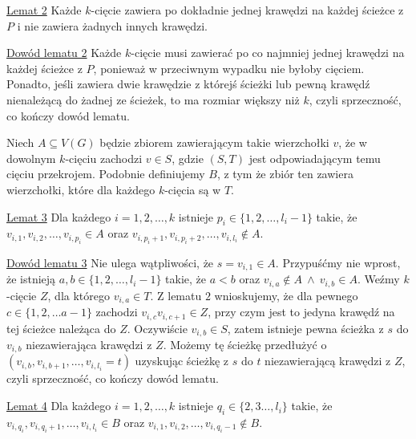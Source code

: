 \documentclass[12pt]{article}
\begin{document}
	\medskip
	
	\underline{Lemat 2} Każde \(k\)-cięcie zawiera po dokładnie jednej krawędzi
	na każdej ścieżce z \(P\) i nie zawiera żadnych innych krawędzi.
	
	\medskip
	
	\underline{Dowód lematu 2} Każde \(k\)-cięcie musi zawierać po co najmniej
	jednej krawędzi na każdej ścieżce z \(P\), ponieważ w przeciwnym wypadku nie
	byłoby cięciem. Ponadto, jeśli zawiera dwie krawędzie z którejś ścieżki lub
	pewną krawędź nienależącą do żadnej ze ścieżek, to ma rozmiar większy niż
	\(k\), czyli sprzeczność, co kończy dowód lematu.
	
	\medskip
	
	Niech \(A \subseteq V(G)\) będzie zbiorem zawierającym takie wierzchołki
	\(v\), że w dowolnym \(k\)-cięciu zachodzi \(v \in S\), gdzie \((S, T)\)
	jest odpowiadającym temu cięciu przekrojem. Podobnie definiujemy \(B\), z
	tym że zbiór ten zawiera wierzchołki, które dla każdego \(k\)-cięcia są w
	\(T\).
	
	\medskip
	
	\underline{Lemat 3} Dla każdego \(i = 1, 2, \ldots, k\) istnieje \(p_{i} \in
	\{ 1, 2, \ldots, l_{i} - 1\}\) takie, że \(v_{i, 1}, v_{i, 2}, \ldots, v_{i,
	p_{i}} \in A\) oraz \(v_{i, p_{i} + 1}, v_{i, p_{i} + 2}, \ldots, v_{i,
	l_{i}} \notin A\).
	
	\medskip
	
	\underline{Dowód lematu 3} Nie ulega wątpliwości, że \(s = v_{i, 1} \in A\).
	Przypuśćmy nie wprost, że istnieją \(a, b \in \{1, 2, \ldots, l_{i} - 1\}\)
	takie, że \(a < b\) oraz \(v_{i, a} \notin A \ \wedge \ v_{i, b} \in A\).
	Weźmy \(k\)-cięcie \(Z\), dla którego \(v_{i, a} \in T\). Z lematu \(2\)
	wnioskujemy, że dla pewnego \(c \in \{1, 2, \ldots a - 1\}\) zachodzi
	\(v_{i, c} v_{i, c + 1} \in Z\), przy czym jest to jedyna krawędź na tej
	ścieżce należąca do \(Z\). Oczywiście \(v_{i, b} \in S\), zatem istnieje
	pewna ścieżka z \(s\) do \(v_{i, b}\) niezawierająca krawędzi z \(Z\).
	Możemy tę ścieżkę przedłużyć o \((v_{i, b}, v_{i, b + 1}, \ldots, v_{i,
	l_{i}} = t)\) uzyskując ścieżkę z \(s\) do \(t\) niezawierającą krawędzi z
	\(Z\), czyli sprzeczność, co kończy dowód lematu.
	
	\medskip
	
	\underline{Lemat 4} Dla każdego \(i = 1, 2, \ldots, k\) istnieje \(q_{i} \in
	\{ 2, 3 \ldots, l_{i}\}\) takie, że \(v_{i, q_{i}}, v_{i, q_{i} + 1},
	\ldots, v_{i, l_{i}} \in B\) oraz \(v_{i, 1}, v_{i, 2}, \ldots, v_{i, q_{i}
	- 1} \notin B\).
	
\end{document}
